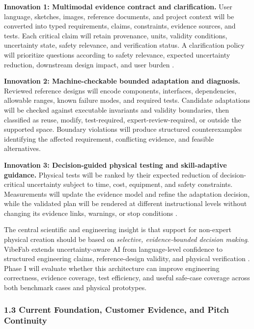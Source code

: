 \documentclass[11pt,letterpaper]{article}
\begin{document}
\textbf{Innovation 1: Multimodal evidence contract and clarification.}
User language, sketches, images, reference documents, and project context will be converted into typed requirements, claims, constraints, evidence sources, and tests. Each critical claim will retain provenance, units, validity conditions, uncertainty state, safety relevance, and verification status. A clarification policy will prioritize questions according to safety relevance, expected uncertainty reduction, downstream design impact, and user burden \cite{liu2023llava,li2023blip2,yue2024mmmu,blecher2024nougat,peng2025dochmet}.

\textbf{Innovation 2: Machine-checkable bounded adaptation and diagnosis.}
Reviewed reference designs will encode components, interfaces, dependencies, allowable ranges, known failure modes, and required tests. Candidate adaptations will be checked against executable invariants and validity boundaries, then classified as reuse, modify, test-required, expert-review-required, or outside the supported space. Boundary violations will produce structured counterexamples identifying the affected requirement, conflicting evidence, and feasible alternatives.

\textbf{Innovation 3: Decision-guided physical testing and skill-adaptive guidance.}
Physical tests will be ranked by their expected reduction of decision-critical uncertainty subject to time, cost, equipment, and safety constraints. Measurements will update the evidence model and refine the adaptation decision, while the validated plan will be rendered at different instructional levels without changing its evidence links, warnings, or stop conditions \cite{driess2023palme,brohan2023rt2,torne2024realtosim,madaan2023selfrefine,shinn2023reflexion,huang2024selfcorrect}.

The central scientific and engineering insight is that support for non-expert physical creation should be based on \emph{selective, evidence-bounded decision making}. VibeFab extends uncertainty-aware AI from language-level confidence to structured engineering claims, reference-design validity, and physical verification \cite{kuhn2023semanticuncertainty,farquhar2024semanticentropy,angelopoulos2023conformal}. Phase I will evaluate whether this architecture can improve engineering correctness, evidence coverage, test efficiency, and useful safe-case coverage across both benchmark cases and physical prototypes.

\subsubsection*{1.3 Current Foundation, Customer Evidence, and Pitch Continuity}
\end{document}
